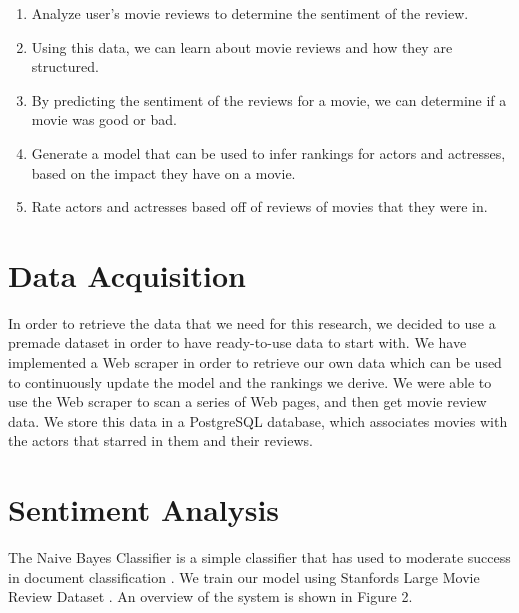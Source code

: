 \documentclass[a0,portrait]{a0poster}
\begin{document}
\begin{multicols}{2}
\begin{enumerate}
\item Analyze user's movie reviews to determine the sentiment of the review. 
\item Using this data, we can learn about movie reviews and how they are structured.
\item By predicting the sentiment of the reviews for a movie, we can determine if a movie was good or bad.
\item Generate a model that can be used to infer rankings for actors and actresses, based on the impact they have on a movie.
\item Rate actors and actresses based off of reviews of movies that they were in.
\end{enumerate}

\section*{Data Acquisition}

In order to retrieve the data that we need for this research, we decided to use a premade dataset in order to have ready-to-use data to start with.  We have implemented a Web scraper in order to retrieve our own data which can be used to continuously update the model and the rankings we derive. We were able to use the Web scraper to scan a series of Web pages, and then get movie review data. We store this data in a PostgreSQL database, which associates movies with the actors that starred in them and their reviews.

\section*{Sentiment Analysis}

The Naive Bayes Classifier is a simple classifier that has used to moderate success in document classification \cite{hand_idiots_2001, mccallum_comparison_1998}. We train our model using Stanfords Large Movie Review Dataset \cite{maas_learning_2011}. An overview of the system is shown in Figure 2.


\end{multicols}
\end{document}
